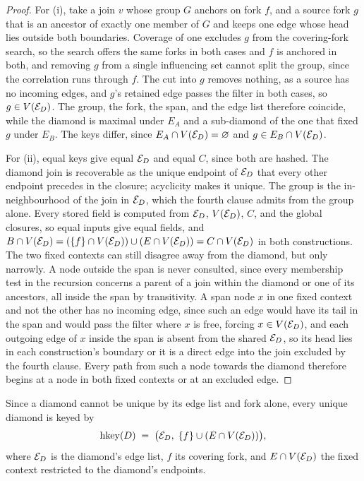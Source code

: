 \documentclass[12pt]{report}
\begin{document}
\begin{proof}
For (i), take a join $v$ whose group $G$ anchors on fork $f$, and a source fork $g$ that is an ancestor of exactly one member of $G$ and keeps one edge whose head lies outside both boundaries. Coverage of one excludes $g$ from the covering-fork search, so the search offers the same forks in both cases and $f$ is anchored in both, and removing $g$ from a single influencing set cannot split the group, since the correlation runs through $f$. The cut into $g$ removes nothing, as a source has no incoming edges, and $g$'s retained edge passes the filter in both cases, so $g \in V(\mathcal{E}_D)$. The group, the fork, the span, and the edge list therefore coincide, while the diamond is maximal under $E_A$ and a sub-diamond of the one that fixed $g$ under $E_B$. The keys differ, since $E_A \cap V(\mathcal{E}_D) = \varnothing$ and $g \in E_B \cap V(\mathcal{E}_D)$.

For (ii), equal keys give equal $\mathcal{E}_D$ and equal $C$, since both are hashed. The diamond join is recoverable as the unique endpoint of $\mathcal{E}_D$ that every other endpoint precedes in the closure; acyclicity makes it unique. The group is the in-neighbourhood of the join in $\mathcal{E}_D$, which the fourth clause admits from the group alone. Every stored field is computed from $\mathcal{E}_D$, $V(\mathcal{E}_D)$, $C$, and the global closures, so equal inputs give equal fields, and $B\cap V(\mathcal{E}_D) = (\{f\}\cap V(\mathcal{E}_D)) \cup (E\cap V(\mathcal{E}_D)) = C \cap V(\mathcal{E}_D)$ in both constructions. The two fixed contexts can still disagree away from the diamond, but only narrowly. A node outside the span is never consulted, since every membership test in the recursion concerns a parent of a join within the diamond or one of its ancestors, all inside the span by transitivity. A span node $x$ in one fixed context and not the other has no incoming edge, since such an edge would have its tail in the span and would pass the filter where $x$ is free, forcing $x \in V(\mathcal{E}_D)$, and each outgoing edge of $x$ inside the span is absent from the shared $\mathcal{E}_D$, so its head lies in each construction's boundary or it is a direct edge into the join excluded by the fourth clause. Every path from such a node towards the diamond therefore begins at a node in both fixed contexts or at an excluded edge.
\end{proof}

Since a diamond cannot be unique by its edge list and fork alone, every unique diamond is keyed by
\[
\mathrm{hkey}(D) \;=\; \bigl(\mathcal{E}_D,\; \{f\} \cup (E \cap V(\mathcal{E}_D))\bigr) ,
\]
where $\mathcal{E}_D$ is the diamond's edge list, $f$ its covering fork, and $E \cap V(\mathcal{E}_D)$ the fixed context restricted to the diamond's endpoints.
\end{document}
